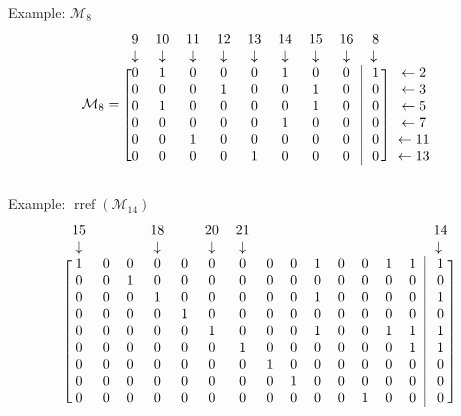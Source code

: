 \documentclass{beamer}
\begin{document}
\begin{frame}{Example: $\mathcal{M}_8$}
  \[
    \mathcal{M}_8 =
    \begin{blockarray}{cccccccccc}
      9 & 10 & 11 & 12 & 13 & 14 & 15 & 16 & 8 \\
      \downarrow & \downarrow & \downarrow & \downarrow & \downarrow &
      \downarrow & \downarrow & \downarrow & \downarrow \\
      \begin{block}{[cccccccc|c]c}
        0 & 1  & 0  & 0  & 0  & 1  & 0  & 0  & 1 & \leftarrow 2 \\
        0 & 0  & 0  & 1  & 0  & 0  & 1  & 0  & 0 & \leftarrow 3 \\
        0 & 1  & 0  & 0  & 0  & 0  & 1  & 0  & 0 & \leftarrow 5 \\
        0 & 0  & 0  & 0  & 0  & 1  & 0  & 0  & 0 & \leftarrow 7 \\
        0 & 0  & 1  & 0  & 0  & 0  & 0  & 0  & 0 & \leftarrow 11 \\
        0 & 0  & 0  & 0  & 1  & 0  & 0  & 0  & 0 & \leftarrow 13 \\
      \end{block}
    \end{blockarray}
  \]
\end{frame}

\begin{frame}{Example: $\operatorname{rref}(\mathcal{M}_{14})$}
  \[
    \begin{blockarray}{ccccccccccccccc}
      15         & & & 18         & & 20         & 21         & & & & & & & & 14         \\
      \downarrow & & & \downarrow & & \downarrow & \downarrow & & & & & & & & \downarrow \\
    \begin{block}{[cccccccccccccc|c]}
      1 & 0 & 0 & 0 & 0 & 0 & 0 & 0 & 0 & 1 & 0 & 0 & 1 & 1 & 1 \\
      0 & 0 & 1 & 0 & 0 & 0 & 0 & 0 & 0 & 0 & 0 & 0 & 0 & 0 & 0 \\
      0 & 0 & 0 & 1 & 0 & 0 & 0 & 0 & 0 & 1 & 0 & 0 & 0 & 0 & 1 \\
      0 & 0 & 0 & 0 & 1 & 0 & 0 & 0 & 0 & 0 & 0 & 0 & 0 & 0 & 0 \\
      0 & 0 & 0 & 0 & 0 & 1 & 0 & 0 & 0 & 1 & 0 & 0 & 1 & 1 & 1 \\
      0 & 0 & 0 & 0 & 0 & 0 & 1 & 0 & 0 & 0 & 0 & 0 & 0 & 1 & 1 \\
      0 & 0 & 0 & 0 & 0 & 0 & 0 & 1 & 0 & 0 & 0 & 0 & 0 & 0 & 0 \\
      0 & 0 & 0 & 0 & 0 & 0 & 0 & 0 & 1 & 0 & 0 & 0 & 0 & 0 & 0 \\
      0 & 0 & 0 & 0 & 0 & 0 & 0 & 0 & 0 & 0 & 0 & 1 & 0 & 0 & 0 \\
    \end{block}
    \end{blockarray}
  \]
\end{frame}
\end{document}
